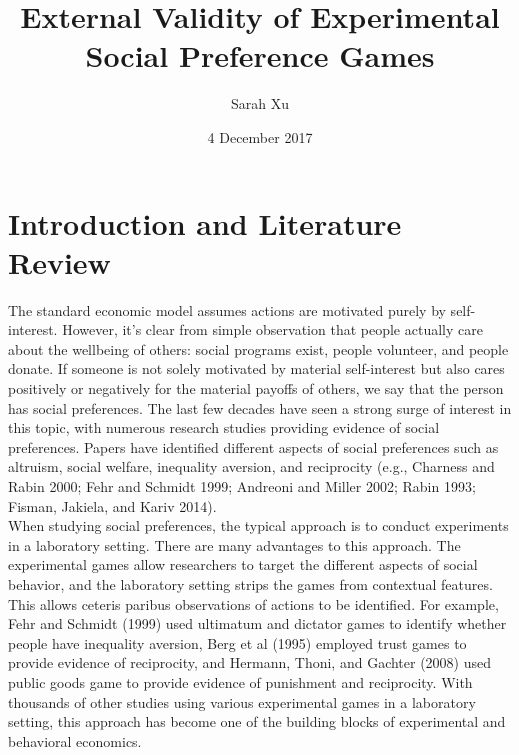 \documentclass{article}
\title{External Validity of Experimental Social Preference Games}
\author{Sarah Xu}
\date{4 December 2017}
\begin{document}
\maketitle

\section{Introduction and Literature Review}

The standard economic model assumes actions are motivated purely by self-interest. However, it\rq s clear from simple observation that people actually care about the wellbeing of others: social programs exist, people volunteer, and people donate. If someone is not solely motivated by material self-interest but also cares positively or negatively for the material payoffs of others, we say that the person has social preferences. The last few decades have seen a strong surge of interest in this topic, with numerous research studies providing evidence of social preferences. Papers have identified different aspects of social preferences such as altruism, social welfare, inequality aversion, and reciprocity (e.g., Charness and Rabin 2000; Fehr and Schmidt 1999; Andreoni and Miller 2002; Rabin 1993; Fisman, Jakiela, and Kariv 2014). \\
 
When studying social preferences, the typical approach is to conduct experiments in a laboratory setting. There are many advantages to this approach. The experimental games allow researchers to target the different aspects of social behavior, and the laboratory setting strips the games from contextual features. This allows ceteris paribus observations of actions to be identified. For example, Fehr and Schmidt (1999) used ultimatum and dictator games to identify whether people have inequality aversion, Berg et al (1995) employed trust games to provide evidence of reciprocity, and Hermann, Thoni, and Gachter (2008) used public goods game to provide evidence of punishment and reciprocity. With thousands of other studies using various experimental games in a laboratory setting, this approach has become one of the building blocks of experimental and behavioral economics. \\
 
\end{document}
